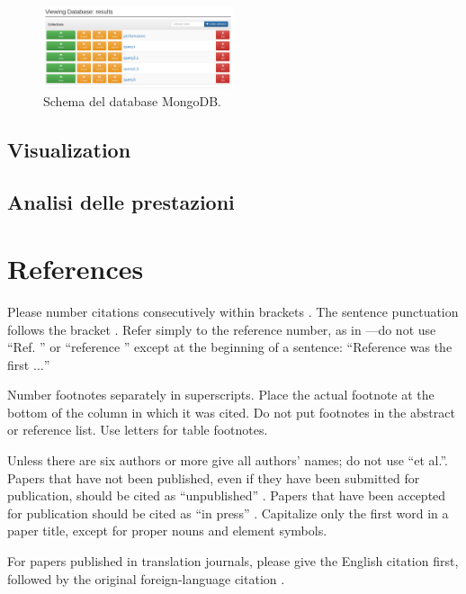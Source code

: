 \documentclass[conference]{IEEEtran}
\begin{document}
\begin{figure}[htbp]
    \centerline{\includegraphics[width=0.5\textwidth]{res/mongo.png}}
    \caption{Schema del database MongoDB.}
    \label{fig:mongo}
\end{figure}
\subsection{Visualization}
\subsection{Analisi delle prestazioni}
\section*{References}

Please number citations consecutively within brackets \cite{b1}. The 
sentence punctuation follows the bracket \cite{b2}. Refer simply to the reference 
number, as in \cite{b3}---do not use ``Ref. \cite{b3}'' or ``reference \cite{b3}'' except at 
the beginning of a sentence: ``Reference \cite{b3} was the first $\ldots$''

Number footnotes separately in superscripts. Place the actual footnote at 
the bottom of the column in which it was cited. Do not put footnotes in the 
abstract or reference list. Use letters for table footnotes.

Unless there are six authors or more give all authors' names; do not use 
``et al.''. Papers that have not been published, even if they have been 
submitted for publication, should be cited as ``unpublished'' \cite{b4}. Papers 
that have been accepted for publication should be cited as ``in press'' \cite{b5}. 
Capitalize only the first word in a paper title, except for proper nouns and 
element symbols.

For papers published in translation journals, please give the English 
citation first, followed by the original foreign-language citation \cite{b6}.
\end{document}
